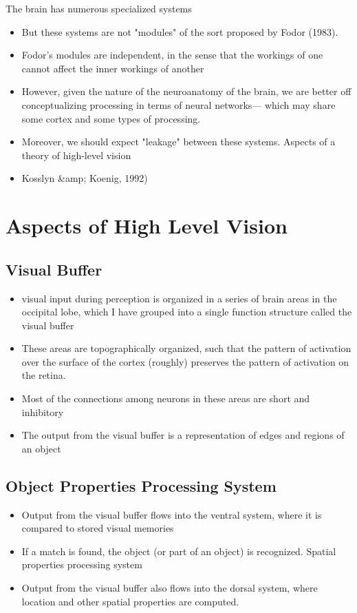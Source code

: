 \documentclass[12pt]{article}
\begin{document}
The brain has numerous specialized systems
\begin{itemize}

\item But these systems are not "modules" of the sort proposed by Fodor (1983).
\item Fodor's modules are independent, in the sense that the workings of one cannot affect the inner workings of another
\item However, given the nature of the neuroanatomy of the brain, we are better off conceptualizing processing in terms of neural networks— which may share some cortex and some types of processing.
\item Moreover, we should expect "leakage" between these systems. Aspects of a theory of high-level vision
\item Kosslyn \&amp; Koenig, 1992)
\end{itemize}

\section{Aspects of High Level Vision}

\subsection{Visual Buffer}

\begin{itemize}

\item visual input during perception is organized in a series of brain areas in the occipital lobe, which I have grouped into a single function structure called the visual buffer
\item These areas are topographically organized, such that the pattern of activation over the surface of the cortex (roughly) preserves the pattern of activation on the retina.
\item Most of the connections among neurons in these areas are short and inhibitory
\item The output from the visual buffer is a representation of edges and regions of an object
\end{itemize}

\subsection{Object Properties Processing System}

\begin{itemize}

\item Output from the visual buffer flows into the ventral system, where it is compared to stored visual memories
\item If a match is found, the object (or part of an object) is recognized. Spatial properties processing system
\item Output from the visual buffer also flows into the dorsal system, where location and other spatial properties are computed.
\end{itemize}
\end{document}
